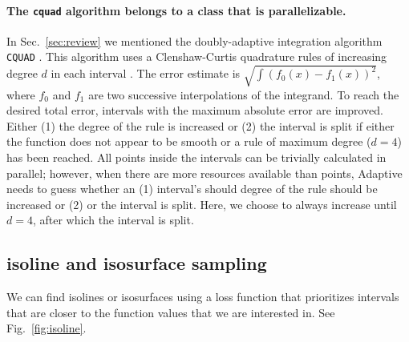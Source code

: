 \documentclass[english, twocolumn, 10pt, aps, superscriptaddress, floatfix, prb, citeautoscript]{revtex4-1}
\renewcommand{\citep}{\cite}
\newcommand{\passthrough}[1]{\lstset{mathescape=false}#1\lstset{mathescape=true}}
\begin{document}
\hypertarget{the-cquad-algorithm-belongs-to-a-class-that-is-parallelizable.}{%
\paragraph{\texorpdfstring{The \texttt{cquad} algorithm belongs to a class that is parallelizable.}{The cquad algorithm belongs to a class that is parallelizable.}}\label{the-cquad-algorithm-belongs-to-a-class-that-is-parallelizable.}}

In Sec.~\ref{sec:review} we mentioned the doubly-adaptive integration algorithm \passthrough{\lstinline!CQUAD!} \citep{Gonnet2010}.
This algorithm uses a Clenshaw-Curtis quadrature rules of increasing degree \(d\) in each interval \citep{Clenshaw1960}.
The error estimate is \(\sqrt{\int{\left(f_0(x) - f_1(x)\right)^2}}\), where \(f_0\) and \(f_1\) are two successive interpolations of the integrand.
To reach the desired total error, intervals with the maximum absolute error are improved.
Either (1) the degree of the rule is increased or (2) the interval is split if either the function does not appear to be smooth or a rule of maximum degree (\(d=4\)) has been reached.
All points inside the intervals can be trivially calculated in parallel; however, when there are more resources available than points, Adaptive needs to guess whether an (1) interval's should degree of the rule should be increased or (2) or the interval is split.
Here, we choose to always increase until \(d=4\), after which the interval is split.

\hypertarget{isoline-and-isosurface-sampling}{%
\subsection{isoline and isosurface sampling}\label{isoline-and-isosurface-sampling}}

We can find isolines or isosurfaces using a loss function that prioritizes intervals that are closer to the function values that we are interested in.
See Fig.~\ref{fig:isoline}.
\end{document}
